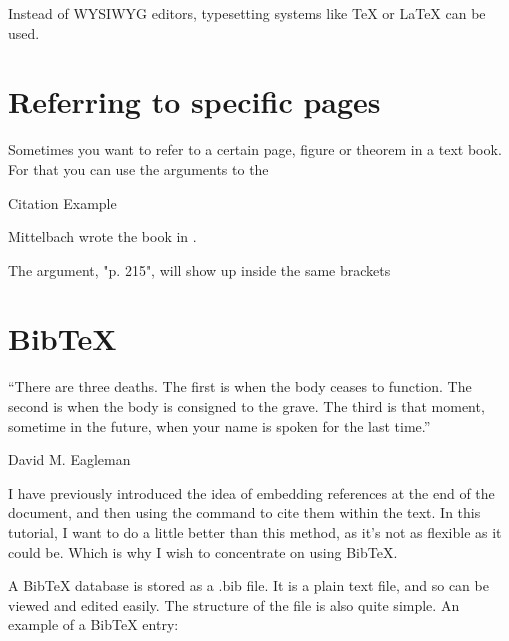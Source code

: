 \begin{refsection}
Instead of WYSIWYG editors, typesetting systems like TeX or LaTeX \parencite{lamport2004} can be used.\cite{Abut1990}

\section{Referring to specific pages}

Sometimes you want to refer to a certain page, figure or theorem in a text book. For that you can use the arguments to the 


\begin{texexample}{Citation Example}{}
\cite{Mittelbach2004}



\parencite[p. 215][]{Mittelbach2004}



\textcite{Mittelbach2004}

Mittelbach wrote the book\autocite{Mittelbach2004} in \citeyear{Mittelbach2004}.
\end{texexample}

The argument, "p. 215", will show up inside the same brackets



\section{BibTeX}
\epigraph{“There are three deaths. The first is when the body ceases to function. The second is when the body is consigned to the grave. The third is that moment, sometime in the future, when your name is spoken for the last time.”}{David M. Eagleman}

I have previously introduced the idea of embedding references at the end of the document, and then using the  command to cite them within the text. In this tutorial, I want to do a little better than this method, as it's not as flexible as it could be. Which is why I wish to concentrate on using BibTeX.

A BibTeX database is stored as a .bib file. It is a plain text file, and so can be viewed and edited easily. The structure of the file is also quite simple. An example of a BibTeX entry:


\end{refsection}
